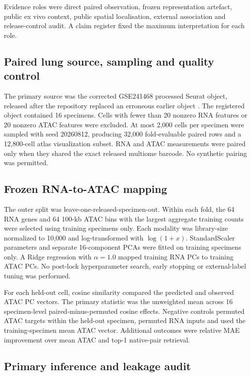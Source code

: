 \documentclass[11pt]{article}
\begin{document}
Evidence roles were direct paired observation, frozen representation artefact, public ex vivo context, public spatial localisation, external association and release-control audit. A claim register fixed the maximum interpretation for each role.

\subsection*{Paired lung source, sampling and quality control}

The primary source was the corrected GSE241468 processed Seurat object, released after the repository replaced an erroneous earlier object \cite{Long2024}. The registered object contained 16 specimens. Cells with fewer than 20 nonzero RNA features or 20 nonzero ATAC features were excluded. At most 2,000 cells per specimen were sampled with seed 20260812, producing 32,000 fold-evaluable paired rows and a 12,800-cell atlas visualization subset. RNA and ATAC measurements were paired only when they shared the exact released multiome barcode. No synthetic pairing was permitted.

\subsection*{Frozen RNA-to-ATAC mapping}

The outer split was leave-one-released-specimen-out. Within each fold, the 64 RNA genes and 64 100-kb ATAC bins with the largest aggregate training counts were selected using training specimens only. Each modality was library-size normalized to 10,000 and log-transformed with $\log(1+x)$. StandardScaler parameters and separate 16-component PCAs were fitted on training specimens only. A Ridge regression with $\alpha=1.0$ mapped training RNA PCs to training ATAC PCs. No post-lock hyperparameter search, early stopping or external-label tuning was performed.

For each held-out cell, cosine similarity compared the predicted and observed ATAC PC vectors. The primary statistic was the unweighted mean across 16 specimen-level paired-minus-permuted cosine effects. Negative controls permuted ATAC targets within the held-out specimen, permuted RNA inputs and used the training-specimen mean ATAC vector. Additional outcomes were relative MAE improvement over mean ATAC and top-1 native-pair retrieval.

\subsection*{Primary inference and leakage audit}
\end{document}
